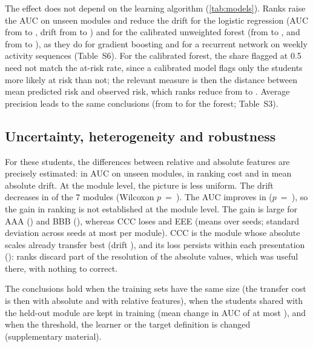 \documentclass[fleqn,10pt]{JLA_article}
\begin{document}
The effect does not depend on the learning algorithm (\cref{tab:models}). Ranks raise the AUC on unseen modules and reduce the drift for the logistic regression (AUC from \resModLogitAucBAbs{} to \resModLogitAucBRank, drift from \resModLogitDriftAbs{} to \resModLogitDriftRank) and for the calibrated unweighted forest (from \resModCalAucBAbs{} to \resModCalAucBRank, and from \resModCalDriftAbs{} to \resModCalDriftRank), as they do for gradient boosting and for a recurrent network on weekly activity sequences (Table~S6). For the calibrated forest, the share flagged at 0.5 need not match the at-risk rate, since a calibrated model flags only the students more likely at risk than not; the relevant measure is then the distance between mean predicted risk and observed risk, which ranks reduce from \resModCalPGapAbs{} to \resModCalPGapRank. Average precision leads to the same conclusions (from \resApBAbs{} to \resApBRel{} for the forest; Table~S3).



\subsection{Uncertainty, heterogeneity and robustness}
\label{sec:uncertainty}
\label{sec:robust}
For these students, the differences between relative and absolute features are precisely estimated: \resCIDiffAucB{} \resCIDiffAucBCI{} in AUC on unseen modules, \resCIDiffCost{} \resCIDiffCostCI{} in ranking cost and \resCIDiffDrift{} \resCIDiffDriftCI{} in mean absolute drift. At the module level, the picture is less uniform. The drift decreases in \resNImprovedDrift{} of the 7 modules (Wilcoxon $p$~=~\resWilcoxonDrift). The AUC improves in \resNImprovedAuc{} ($p$~=~\resWilcoxonAuc), so the gain in ranking is not established at the module level. The gain is large for AAA (\resRelMinusAbsAAA) and BBB (\resRelMinusAbsBBB), whereas CCC loses \resRelMinusAbsCCC{} and EEE \resRelMinusAbsEEE{} (means over \resNSeeds{} seeds; standard deviation across seeds at most \resSeedSdAucMax{} per module). CCC is the module whose absolute scales already transfer best (drift \resCCCDriftAbs), and its loss persists within each presentation (\resCCCIntraDiff): ranks discard part of the resolution of the absolute values, which was useful there, with nothing to correct.

The conclusions hold when the training sets have the same size (the transfer cost is then \resSizeCostAbs{} with absolute and \resSizeCostRel{} with relative features), when the students shared with the held-out module are kept in training (mean change in AUC of at most \resOverlapMeanDiffMax), and when the threshold, the learner or the target definition is changed (supplementary material).
\end{document}
